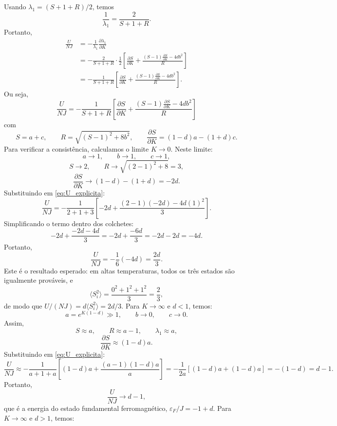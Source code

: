 \documentclass[11pt,a4paper]{article}
\begin{document}
%
Usando \(\lambda_1 = (S + 1 + R)/2\), temos
%
\[
\frac{1}{\lambda_1} = \frac{2}{S + 1 + R}.
\]
%
Portanto,
%
\begin{align}
    \frac{U}{NJ}
    &= - \frac{1}{\lambda_1} \frac{\partial \lambda_1}{\partial K} \\
    &= - \frac{2}{S + 1 + R}
    \cdot \frac{1}{2} \left[
        \frac{\partial S}{\partial K}
        + \frac{(S - 1) \frac{\partial S}{\partial K} - 4 d b^2}{R}
    \right] \\
    &= - \frac{1}{S + 1 + R}
    \left[
        \frac{\partial S}{\partial K}
        + \frac{(S - 1) \frac{\partial S}{\partial K} - 4 d b^2}{R}
    \right].
\end{align}
%
Ou seja,
%
\begin{equation}
    \boxed{
    \frac{U}{NJ} =
    - \frac{1}{S + 1 + R}
    \left[
        \frac{\partial S}{\partial K}
        + \frac{(S - 1) \frac{\partial S}{\partial K} - 4 d b^2}{R}
    \right]
    }
    \label{eq:U_explicita}
\end{equation}
%
com
%
\[
S = a + c, \qquad R = \sqrt{(S - 1)^2 + 8b^2}, \qquad \frac{\partial S}{\partial K} = (1-d)a - (1+d)c.
\]
%
Para verificar a consistência, calculamos o limite \(K \to 0\). Neste limite:
%
\[
a \to 1, \qquad b \to 1, \qquad c \to 1,
\]
\[
S \to 2, \qquad R \to \sqrt{(2-1)^2 + 8} = 3,
\]
\[
\frac{\partial S}{\partial K} \to (1-d) - (1+d) = -2d.
\]
%
Substituindo em \eqref{eq:U_explicita}:
%
\[
\frac{U}{NJ}
= - \frac{1}{2 + 1 + 3}
\left[
    -2d + \frac{(2-1)(-2d) - 4d(1)^2}{3}
\right].
\]
%
Simplificando o termo dentro dos colchetes:
%
\[
-2d + \frac{-2d - 4d}{3}
= -2d + \frac{-6d}{3}
= -2d - 2d = -4d.
\]
%
Portanto,
%
\[
\frac{U}{NJ} = - \frac{1}{6} (-4d) = \frac{2d}{3}.
\]
%
Este é o resultado esperado: em altas temperaturas, todos os três estados são igualmente prováveis, e
%
\[
\langle S_i^2 \rangle = \frac{0^2 + 1^2 + 1^2}{3} = \frac{2}{3},
\]
%
de modo que \(U/(NJ) = d \langle S_i^2 \rangle = 2d/3\).
%
Para \(K \to \infty\) e \(d < 1\), temos:
%
\[
a = e^{K(1-d)} \gg 1, \qquad b \to 0, \qquad c \to 0.
\]
%
Assim,
%
\[
S \approx a, \qquad R \approx a - 1, \qquad \lambda_1 \approx a,
\]
\[
\frac{\partial S}{\partial K} \approx (1-d)a.
\]
%
Substituindo em \eqref{eq:U_explicita}:
%
\[
\frac{U}{NJ}
\approx - \frac{1}{a + 1 + a}
\left[
    (1-d)a + \frac{(a-1)(1-d)a}{a}
\right]
= - \frac{1}{2a}
\left[ (1-d)a + (1-d)a \right]
= -(1-d) = d - 1.
\]
%
Portanto,
%
\[
\frac{U}{NJ} \to d - 1,
\]
%
que é a energia do estado fundamental ferromagnético, \(\varepsilon_F/J = -1 + d\).
%
Para \(K \to \infty\) e \(d > 1\), temos:
\end{document}
